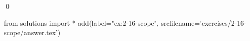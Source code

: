 
\begin{ex}
  \label{ex:2-16-scope}
  
  \qed
\end{ex}
\begin{python0}
from solutions import *
add(label="ex:2-16-scope",
    srcfilename='exercises/2-16-scope/answer.tex')
\end{python0}
